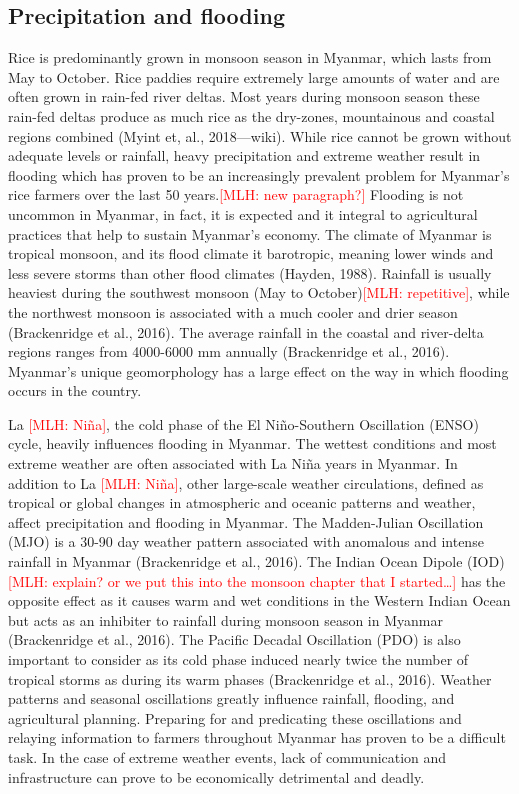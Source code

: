 \documentclass{book}\usepackage{knitr}
\newcommand{\red}[1]{\textcolor{red}{[MLH: #1]}}
\begin{document}
\begin{knitrout}
\begin{kframe}
{\section{Precipitation and flooding}

Rice is predominantly grown in monsoon season in Myanmar, which lasts from May to October. Rice paddies require extremely large amounts of water and are often grown in rain-fed river deltas. Most years during monsoon season these rain-fed deltas produce as much rice as the dry-zones, mountainous and coastal regions combined (Myint et, al., 2018—wiki). While rice cannot be grown without adequate levels or rainfall, heavy precipitation and extreme weather result in flooding which has proven to be an increasingly prevalent problem for Myanmar’s rice farmers over the last 50 years.\red{new paragraph?}
	Flooding is not uncommon in Myanmar, in fact, it is expected and it integral to agricultural practices that help to sustain Myanmar’s economy. The climate of Myanmar is tropical monsoon, and its flood climate it barotropic, meaning lower winds and less severe storms than other flood climates (Hayden, 1988). Rainfall is usually heaviest during the southwest monsoon (May to October)\red{repetitive}, while the northwest monsoon is associated with a much cooler and drier season (Brackenridge et al., 2016). The average rainfall in the coastal and river-delta regions ranges from 4000-6000 mm annually (Brackenridge et al., 2016). 
	Myanmar’s unique geomorphology has a large effect on the way in which flooding occurs in the country. 
	
La \red{Niña}, the cold phase of the El Niño-Southern Oscillation (ENSO) cycle, heavily influences flooding in Myanmar. The wettest conditions and most extreme weather are often associated with La Niña years in Myanmar. In addition to La \red{Niña}, other large-scale weather circulations, defined as tropical or global changes in atmospheric and oceanic patterns and weather, affect precipitation and flooding in Myanmar. The Madden-Julian Oscillation (MJO) is a 30-90 day weather pattern associated with anomalous and intense rainfall in Myanmar (Brackenridge et al., 2016).  The Indian Ocean Dipole (IOD)\red{explain? or we put this into the monsoon chapter that I started\ldots} has the opposite effect as it causes warm and wet conditions in the Western Indian Ocean but acts as an inhibiter to rainfall during monsoon season in Myanmar (Brackenridge et al., 2016). The Pacific Decadal Oscillation (PDO) is also important to consider as its cold phase induced nearly twice the number of tropical storms as during its warm phases (Brackenridge et al., 2016). Weather patterns and seasonal oscillations greatly influence rainfall, flooding, and agricultural planning. Preparing for and predicating these oscillations and relaying information to farmers throughout Myanmar has proven to be a difficult task. In the case of extreme weather events, lack of communication and infrastructure can prove to be economically detrimental and deadly. 


}
\end{kframe}
\end{knitrout}
\end{document}
